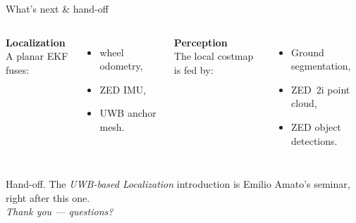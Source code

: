 \begin{frame}{What's next \& hand-off}
  \begin{columns}[T,onlytextwidth]
      \textbf{\alert{Localization}}\\
      A planar EKF fuses:
      \begin{itemize}\setlength\itemsep{2pt}
        \item wheel odometry,
        \item ZED IMU,
        \item UWB anchor mesh.
      \end{itemize}

      \textbf{\alert{Perception}}\\
      The local costmap is fed by:
      \begin{itemize}\setlength\itemsep{2pt}
        \item Ground segmentation,
        \item ZED~2i point cloud,
        \item ZED object detections.
      \end{itemize}
  \end{columns}

  \vspace{0.9em}
  \centering
  \alert{Hand-off.}\;
  The \emph{UWB-based Localization} introduction is Emilio Amato's seminar,
  right after this one.\\[0.8em]
  \alert{\textit{Thank you — questions?}}
\end{frame}
